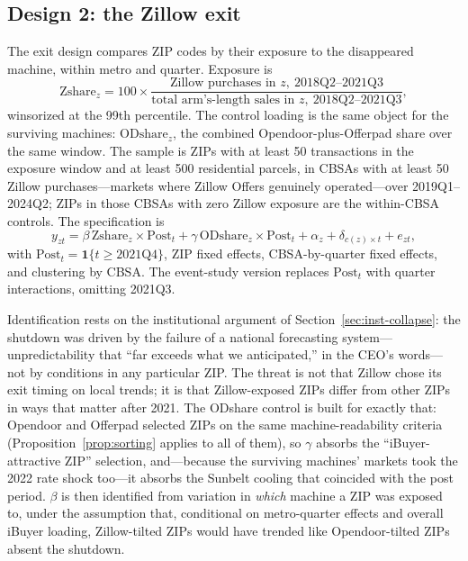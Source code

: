 \documentclass[12pt, letterpaper]{article}
\theoremstyle{remark}
\newcommand{\ind}[1]{\mathbf{1}\{#1\}}
\begin{document}
\subsection{Design 2: the Zillow exit}\label{sec:strategy-exit}

The exit design compares ZIP codes by their exposure to the disappeared machine, within metro and quarter. Exposure is
\begin{equation}
\text{Zshare}_z = 100 \times \frac{\text{Zillow purchases in } z, \ 2018\text{Q}2\text{--}2021\text{Q}3}{\text{total arm's-length sales in } z, \ 2018\text{Q}2\text{--}2021\text{Q}3},
\label{eq:exposure}
\end{equation}
winsorized at the 99th percentile. The control loading is the same object for the surviving machines: $\text{ODshare}_z$, the combined Opendoor-plus-Offerpad share over the same window. The sample is ZIPs with at least 50 transactions in the exposure window and at least 500 residential parcels, in CBSAs with at least 50 Zillow purchases---markets where Zillow Offers genuinely operated---over 2019Q1--2024Q2; ZIPs in those CBSAs with zero Zillow exposure are the within-CBSA controls. The specification is
\begin{equation}
y_{zt} = \beta \, \text{Zshare}_z \times \text{Post}_t + \gamma \, \text{ODshare}_z \times \text{Post}_t + \alpha_z + \delta_{c(z) \times t} + e_{zt},
\label{eq:exit}
\end{equation}
with $\text{Post}_t = \ind{t \ge 2021\text{Q}4}$, ZIP fixed effects, CBSA-by-quarter fixed effects, and clustering by CBSA. The event-study version replaces $\text{Post}_t$ with quarter interactions, omitting 2021Q3.

Identification rests on the institutional argument of Section~\ref{sec:inst-collapse}: the shutdown was driven by the failure of a national forecasting system---unpredictability that ``far exceeds what we anticipated,'' in the CEO's words---not by conditions in any particular ZIP. The threat is not that Zillow chose its exit timing on local trends; it is that Zillow-exposed ZIPs differ from other ZIPs in ways that matter after 2021. The ODshare control is built for exactly that: Opendoor and Offerpad selected ZIPs on the same machine-readability criteria (Proposition~\ref{prop:sorting} applies to all of them), so $\gamma$ absorbs the ``iBuyer-attractive ZIP'' selection, and---because the surviving machines' markets took the 2022 rate shock too---it absorbs the Sunbelt cooling that coincided with the post period. $\beta$ is then identified from variation in \emph{which} machine a ZIP was exposed to, under the assumption that, conditional on metro-quarter effects and overall iBuyer loading, Zillow-tilted ZIPs would have trended like Opendoor-tilted ZIPs absent the shutdown.
\end{document}
